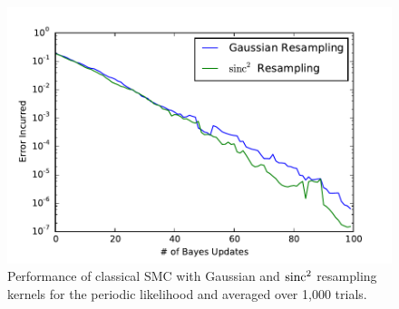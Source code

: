 \documentclass[aps,amsmath,onecolumn,amssymb]{revtex4}
\begin{document}
\begin{figure}
    \begin{centering}
        \includegraphics[width=0.6\columnwidth]{lw-sinc-resampling.pdf}
    \end{centering}
    \caption{
        \label{fig:lw-sinc-resampling}
        Performance of classical SMC with Gaussian and $\operatorname{sinc}^2$ resampling kernels
        for the  periodic likelihood  and averaged over
        1,000 trials.
    }
\end{figure}
\end{document}
